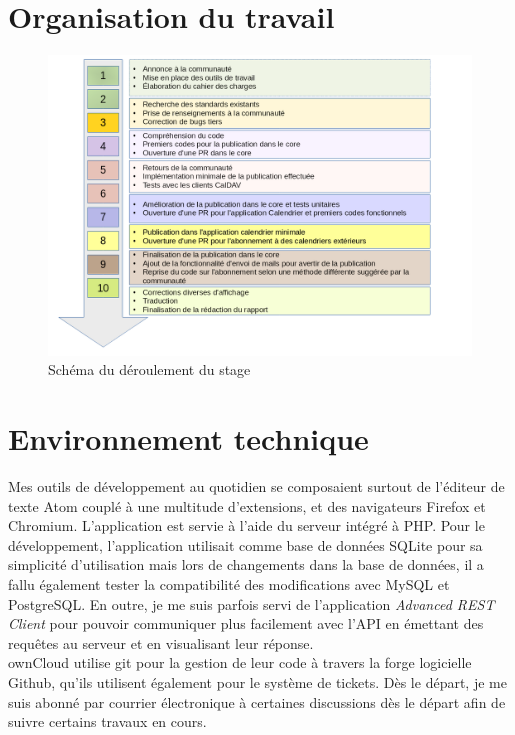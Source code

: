 \documentclass[10pt,a4paper, twoside]{report}
\begin{document}
	\section{Organisation du travail}
	\begin{figure}[H]
		\centering
		\caption{Schéma du déroulement du stage}
		\centerline{\includegraphics[width=1.45\textwidth]{images/deroulement.png}}
		\label{normal_case}
	\end{figure}
	
	\section{Environnement technique}
	Mes outils de développement au quotidien se composaient surtout de l'éditeur de texte Atom couplé à une multitude d'extensions, et des navigateurs Firefox et Chromium. L'application est servie à l'aide du serveur intégré à PHP. Pour le développement, l'application utilisait comme base de données SQLite pour sa simplicité d'utilisation mais lors de changements dans la base de données, il a fallu également tester la compatibilité des modifications avec MySQL et PostgreSQL.
	En outre, je me suis parfois servi de l'application \textit{Advanced REST Client} pour pouvoir communiquer plus facilement avec l'API en émettant des requêtes au serveur et en visualisant leur réponse.
	\\
	
	ownCloud utilise git pour la gestion de leur code à travers la forge logicielle Github, qu'ils utilisent également pour le système de tickets. Dès le départ, je me suis abonné par courrier électronique à certaines discussions dès le départ afin de suivre certains travaux en cours.
	\\
	
\end{document}

